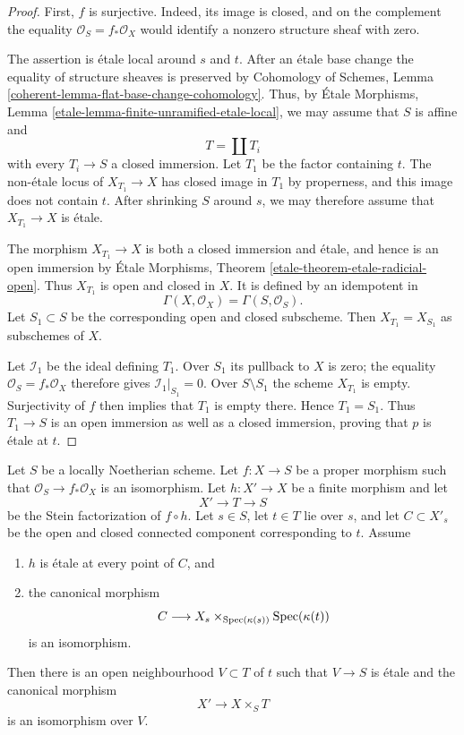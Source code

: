 \begin{proof}
First, $f$ is surjective. Indeed, its image is closed, and on the complement
the equality $\mathcal{O}_S = f_*\mathcal{O}_X$ would identify a nonzero
structure sheaf with zero.

\medskip\noindent
The assertion is \'etale local around $s$ and $t$. After an \'etale base change
the equality of structure sheaves is preserved by Cohomology of Schemes,
Lemma \ref{coherent-lemma-flat-base-change-cohomology}. Thus, by \'Etale
Morphisms, Lemma \ref{etale-lemma-finite-unramified-etale-local}, we may
assume that $S$ is affine and
$$
T = \coprod T_i
$$
with every $T_i \to S$ a closed immersion. Let $T_1$ be the factor containing
$t$. The non-\'etale locus of $X_{T_1} \to X$ has closed image in $T_1$ by
properness, and this image does not contain $t$. After shrinking $S$ around
$s$, we may therefore assume that $X_{T_1} \to X$ is \'etale.

\medskip\noindent
The morphism $X_{T_1} \to X$ is both a closed immersion and \'etale, and hence
is an open immersion by \'Etale Morphisms, Theorem
\ref{etale-theorem-etale-radicial-open}. Thus $X_{T_1}$ is open and closed in
$X$. It is defined by an idempotent in
$$
\Gamma(X, \mathcal{O}_X) = \Gamma(S, \mathcal{O}_S).
$$
Let $S_1 \subset S$ be the corresponding open and closed subscheme. Then
$X_{T_1} = X_{S_1}$ as subschemes of $X$.

\medskip\noindent
Let $\mathcal{I}_1$ be the ideal defining $T_1$. Over $S_1$ its pullback to
$X$ is zero; the equality $\mathcal{O}_S = f_*\mathcal{O}_X$ therefore gives
$\mathcal{I}_1|_{S_1} = 0$. Over $S \setminus S_1$ the scheme $X_{T_1}$ is
empty. Surjectivity of $f$ then implies that $T_1$ is empty there. Hence
$T_1 = S_1$. Thus $T_1 \to S$ is an open immersion as well as a closed
immersion, proving that $p$ is \'etale at $t$.
\end{proof}

\begin{lemma}
\label{lemma-local-Stein-trivial-component}
\begin{reference}
\cite[Expos\'e 182, Th\'eor\`eme 11, pp. 213--214]{FGA}
\end{reference}
Let $S$ be a locally Noetherian scheme. Let $f : X \to S$ be a proper
morphism such that $\mathcal{O}_S \to f_*\mathcal{O}_X$ is an isomorphism.
Let $h : X' \to X$ be a finite morphism and let
$$
X' \longrightarrow T \longrightarrow S
$$
be the Stein factorization of $f \circ h$. Let $s \in S$, let $t \in T$ lie
over $s$, and let $C \subset X'_s$ be the open and closed connected component
corresponding to $t$. Assume
\begin{enumerate}
\item $h$ is \'etale at every point of $C$, and
\item the canonical morphism
$$
C \longrightarrow
X_s \times_{\mathop{\mathrm{Spec}}(\kappa(s))} \mathop{\mathrm{Spec}}(\kappa(t))
$$
is an isomorphism.
\end{enumerate}
Then there is an open neighbourhood $V \subset T$ of $t$ such that
$V \to S$ is \'etale and the canonical morphism
$$
X' \longrightarrow X \times_S T
$$
is an isomorphism over $V$.
\end{lemma}

